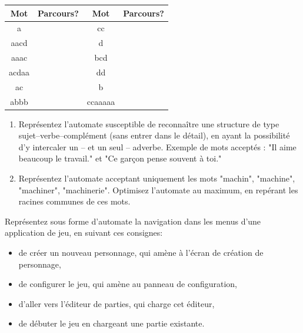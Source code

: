 \begin{center}
\begin{table}[h]
\begin{tabular}{|c|p{6cm}||c|p{6cm}|}
\hline
Mot		&Parcours?	&Mot	&Parcours?\\
\hline
a		&		&cc	&		\\
\hline
aacd		&		&d	&		\\
\hline
aaac		&		&bcd	&		\\
\hline
acdaa		&		&dd	&		\\
\hline
ac		&		&b	&		\\
\hline
abbb		&		&ccaaaaa&		\\
\hline
\end{tabular}
\end{table}
\end{center}
\exer
\begin{enumerate}
  \item  Représentez l'automate susceptible de reconnaître une structure de type sujet--verbe--complément (sans entrer dans le détail), en ayant la possibilité d'y intercaler
un – et un seul – adverbe. Exemple de mots acceptés : "Il aime beaucoup le travail."
et "Ce garçon pense souvent à toi."
  \item  Représentez l'automate acceptant uniquement les mots "machin", "machine",
"machiner", "machinerie". Optimisez l'automate au maximum, en repérant les
racines communes de ces mots.
\end{enumerate}

\exer
Représentez sous forme d'automate la navigation dans les menus d'une application de jeu,
en suivant ces consignes:
\begin{itemize}
  \item  de créer un nouveau personnage, qui amène à l'écran de création de
personnage,
  \item  de configurer le jeu, qui amène au panneau de configuration,
  \item  d'aller vers l'éditeur de parties, qui charge cet éditeur,
  \item  de débuter le jeu en chargeant une partie existante.
\end{itemize}

